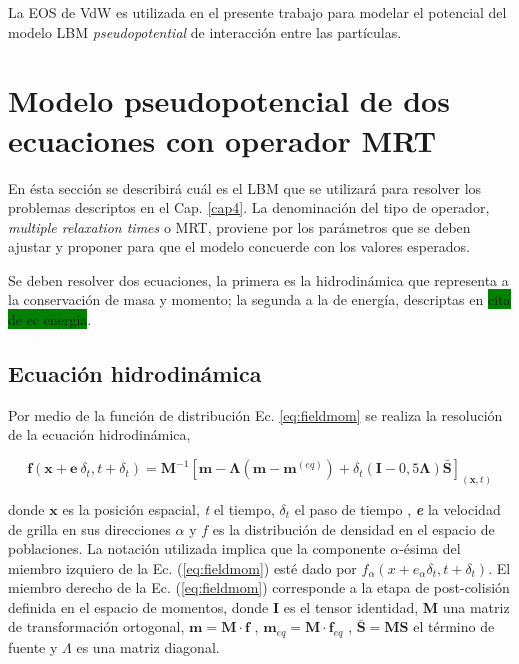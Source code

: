 La EOS de VdW es utilizada en el presente trabajo para modelar el potencial del modelo LBM \textit{pseudopotential} de interacción entre las partículas.


\section{Modelo pseudopotencial de dos ecuaciones con operador MRT}

En ésta sección se describirá cuál es el LBM que se utilizará para resolver los problemas descriptos en el Cap. \ref{cap4}. La denominación del tipo de operador, \textit{multiple relaxation times} o MRT, proviene por los parámetros que se deben ajustar y proponer para que el modelo concuerde con los valores esperados.

Se deben resolver dos ecuaciones, la primera es la hidrodinámica que representa a la conservación de masa y momento; la segunda a la de energía, descriptas en \colorbox{green}{cita de ec energia}.


\subsection{Ecuación hidrodinámica}

Por medio de la función de distribución Ec. \ref{eq:fieldmom} \cite{li2013lattice} se realiza la resolución de la ecuación hidrodinámica,

\begin{equation}
    \mathbf{f}(\mathbf{x} + \mathbf{e} \> \delta_{t} , t + \delta_{t}) = \mathbf{M}^{-1} \left[ \mathbf{m} - \mathbf{\Lambda}(\mathbf{m} - \mathbf{m}^{(eq)}) + \delta_{t} \left( \mathbf{I} - 0,5 \mathbf{\Lambda} \right) \mathbf{\bar{S}}  \right]_{(\mathbf{x},t)} 
    \label{eq:fieldmom}
\end{equation}

donde $\mathbf{x}$ es la posición espacial, \textit{t} el tiempo, $\delta_{t}$ el paso de tiempo , \textit{\textbf{e}} la velocidad de grilla en sus direcciones $\alpha$ y $\textit{f}$ es la distribución de densidad en el espacio de poblaciones. La notación utilizada implica que la componente $\alpha$-ésima del miembro izquiero de la Ec. (\ref{eq:fieldmom}) esté dado por $f_{\alpha}(x + e_{\alpha} \delta_{t}  , t + \delta_{t} )$. El miembro derecho de la Ec. (\ref{eq:fieldmom}) corresponde a la etapa de post-colisión definida en el espacio de momentos, donde \textbf{I} es el tensor identidad, \textbf{M} una matriz de transformación ortogonal, $\mathbf{m} = \mathbf{M} \cdot \mathbf{f}$ , $\mathbf{m}_{eq} = \mathbf{M} \cdot \mathbf{f}_{eq}$ , $\mathbf{\bar{S}} = \mathbf{M} \mathbf{S}$ el término de fuente y $ \Lambda$ es una matriz diagonal.

